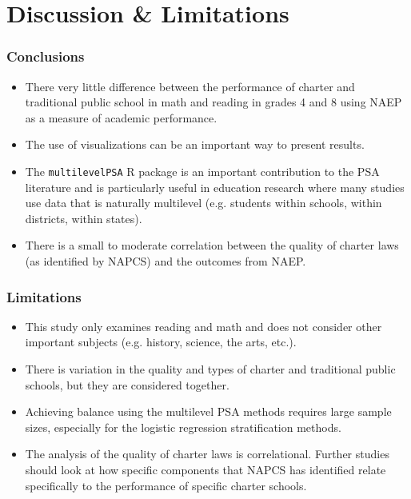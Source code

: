 \documentclass[10pt,handout,mathserif]{beamer}
\begin{document}
\section{Discussion \& Limitations}

\begin{frame}[c]
    \frametitle{Conclusions}
    \begin{itemize}
    \setlength{\itemsep}{10pt}
        \item There very little difference between the performance of charter and traditional public school in math and reading in grades 4 and 8 using NAEP as a measure of academic performance.
        \item The use of visualizations can be an important way to present results.
        \item The \texttt{multilevelPSA} R package is an important contribution to the PSA literature and is particularly useful in education research where many studies use data that is naturally multilevel (e.g. students within schools, within districts, within states).
        \item There is a small to moderate correlation between the quality of charter laws (as identified by NAPCS) and the outcomes from NAEP.
    \end{itemize}
\end{frame}

\begin{frame}[c]
    \frametitle{Limitations}
    \begin{itemize}
    \setlength{\itemsep}{10pt}
        \item This study only examines reading and math and does not consider other important subjects (e.g. history, science, the arts, etc.).
        \item There is variation in the quality and types of charter and traditional public schools, but they are considered together.
        \item Achieving balance using the multilevel PSA methods requires large sample sizes, especially for the logistic regression stratification methods.
        \item The analysis of the quality of charter laws is correlational. Further studies should look at how specific components that NAPCS has identified relate specifically to the performance of specific charter schools.
    \end{itemize}
\end{frame}
\end{document}
